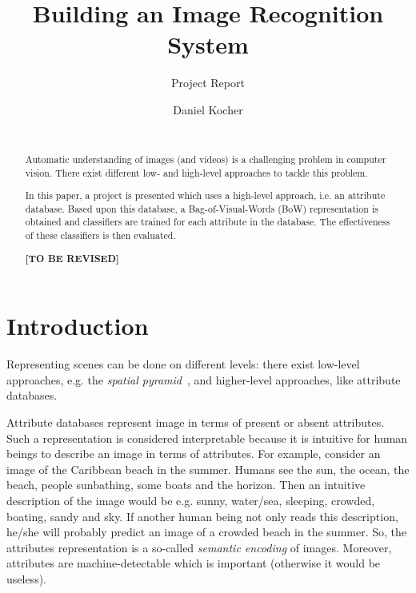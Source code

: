 \documentclass{vldb}
\newcommand{\tbr}{{\color{red}\textbf{[TO BE REVISED]}}}
\begin{document}
\title{Building an Image Recognition System}
\subtitle{Project Report}


\author{
\alignauthor
	Daniel Kocher\\
  \\
}

\maketitle

\begin{abstract}
Automatic understanding of images (and videos) is a challenging problem in
computer vision. There exist different low- and high-level approaches to tackle
this problem.

In this paper, a project is presented which uses a high-level approach, i.e. an
attribute database. Based upon this database, a Bag-of-Visual-Words (BoW)
representation is obtained and classifiers are trained for each attribute in the
database. The effectiveness of these classifiers is then evaluated.

\tbr
\end{abstract}

\section{Introduction}
\label{sec:introduction}

Representing scenes can be done on different levels: there exist
low-level approaches, e.g. the \emph{spatial pyramid}~\cite{Lazebnik:2006}, and
higher-level approaches, like attribute databases. 

Attribute databases represent image in terms of present or absent attributes.
Such a representation is considered interpretable because it is intuitive for
human beings to describe an image in terms of attributes. For example, consider
an image of the Caribbean beach in the summer. Humans see the sun, the ocean,
the beach, people sunbathing, some boats and the horizon. Then an intuitive
description of the image would be e.g. sunny, water/sea, sleeping, crowded,
boating, sandy and sky. If another human being not only reads this description,
he/she will probably predict an image of a crowded beach in the summer. So,
the attributes representation is a so-called \emph{semantic encoding} of images.
Moreover, attributes are machine-detectable which is important (otherwise it would
be useless).
\end{document}

